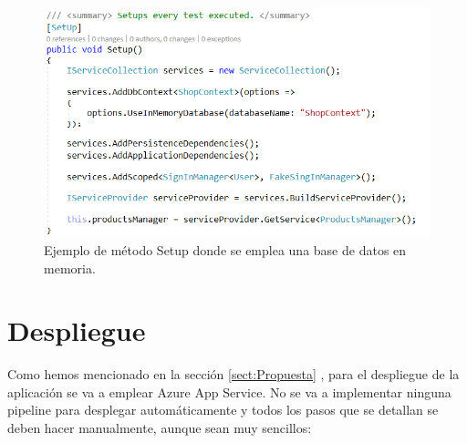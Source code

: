 \documentclass[11pt,spanish,listoffigures]{tfgetsinf}
\begin{document}
\begin{figure}[h]
\centering
\includegraphics[scale=0.8]{SetupTest}
\caption{Ejemplo de método Setup donde se emplea una base de datos en memoria.}
\end{figure}

\section{Despliegue}

Como hemos mencionado en la sección \ref{sect:Propuesta} , para el despliegue de la aplicación se va a emplear Azure App Service. No se va a implementar ninguna pipeline para desplegar automáticamente y todos los pasos que se detallan se deben hacer manualmente, aunque sean muy sencillos:
\end{document}
